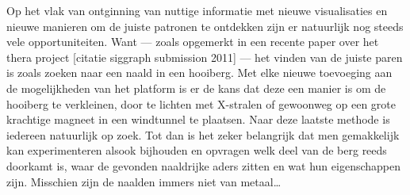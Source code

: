 Op het vlak van ontginning van nuttige informatie met nieuwe visualisaties en nieuwe manieren om de juiste patronen te ontdekken zijn er natuurlijk nog steeds vele opportuniteiten. Want --- zoals opgemerkt in een recente paper over het thera project [citatie siggraph submission 2011] --- het vinden van de juiste paren is zoals zoeken naar een naald in een hooiberg. Met elke nieuwe toevoeging aan de mogelijkheden van het platform is er de kans dat deze een manier is om de hooiberg te verkleinen, door te lichten met X-stralen of gewoonweg op een grote krachtige magneet in een windtunnel te plaatsen. Naar deze laatste methode is iedereen natuurlijk op zoek. Tot dan is het zeker belangrijk dat men gemakkelijk kan experimenteren alsook bijhouden en opvragen welk deel van de berg reeds doorkamt is, waar de gevonden naaldrijke aders zitten en wat hun eigenschappen zijn. Misschien zijn de naalden immers niet van metaal\ldots